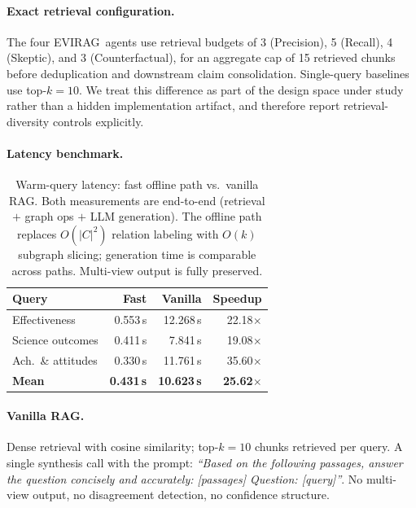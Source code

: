 \documentclass[11pt]{article}
\newcommand{\system}{\textsc{EVIRAG}\xspace}
\begin{document}
\paragraph{Exact retrieval configuration.}
The four \system\ agents use retrieval budgets of 3 (Precision), 5 (Recall), 4
(Skeptic), and 3 (Counterfactual), for an aggregate cap of 15 retrieved chunks
before deduplication and downstream claim consolidation.  Single-query
baselines use top-$k{=}10$.  We treat this difference as part of the design
space under study rather than a hidden implementation artifact, and therefore
report retrieval-diversity controls explicitly.

\paragraph{Latency benchmark.}
\begin{table}[h]
\centering\small
\begin{tabular}{@{}lrrr@{}}
\toprule
\textbf{Query} & \textbf{Fast} & \textbf{Vanilla} & \textbf{Speedup} \\
\midrule
Effectiveness      & 0.553\,s & 12.268\,s & 22.18$\times$ \\
Science outcomes   & 0.411\,s &  7.841\,s & 19.08$\times$ \\
Ach.\ \& attitudes & 0.330\,s & 11.761\,s & 35.60$\times$ \\
\midrule
\textbf{Mean}      & \textbf{0.431\,s} & \textbf{10.623\,s} & \textbf{25.62$\times$} \\
\bottomrule
\end{tabular}
\caption{Warm-query latency: fast offline path vs.\ vanilla RAG.  Both
measurements are end-to-end (retrieval $+$ graph ops $+$ LLM generation).
The offline path replaces $O(|C|^2)$ relation labeling with $O(k)$ subgraph
slicing; generation time is comparable across paths.  Multi-view output is
fully preserved.}
\label{tab:latency}
\end{table}

\paragraph{Vanilla RAG.}
Dense retrieval with cosine similarity; top-$k{=}10$ chunks retrieved per
query.  A single synthesis call with the prompt: \textit{``Based on the
following passages, answer the question concisely and accurately:
[passages] Question: [query]''}.  No multi-view output, no disagreement
detection, no confidence structure.
\end{document}
